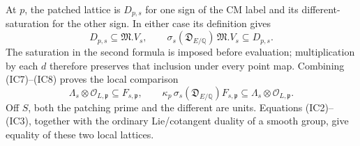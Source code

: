 At \(p\), the patched lattice is \(D_{p,s}\) for one
sign of the CM label and its different-saturation
for the other sign. In either case its definition
gives
\[
 D_{p,s}\subseteq\mathfrak M.V_s,\qquad
 \sigma_s(\mathfrak D_{E/\mathbb Q})\,\mathfrak M.V_s
                                      \subseteq D_{p,s}.
 \tag{IC8}
\]
The saturation in the second formula is imposed before
evaluation; multiplication by each \(d\) therefore
preserves that inclusion under every point map.
Combining (IC7)--(IC8) proves the local comparison
\[
 \Lambda_s\otimes\mathcal O_{L,\mathfrak p}
     \subseteq F_{s,\mathfrak p},\qquad
 \kappa_p\,\sigma_s(\mathfrak D_{E/\mathbb Q})
       F_{s,\mathfrak p}
     \subseteq\Lambda_s\otimes\mathcal O_{L,\mathfrak p}.
 \tag{IC9}
\]
Off \(S\), both the patching prime and the different
are units. Equations (IC2)--(IC3), together with the
ordinary Lie/cotangent duality of a smooth group,
give equality of these two local lattices.

